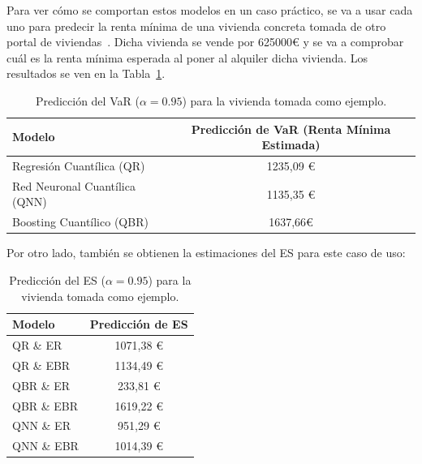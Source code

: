 \documentclass[11pt]{book}
\theoremstyle{plain} %
\theoremstyle{definition} %
\begin{document}
Para ver cómo se comportan estos modelos en un caso práctico, se va a usar
cada uno para predecir la renta mínima de una vivienda concreta tomada de 
otro portal de viviendas~\cite{FC25}. Dicha vivienda se vende por 625000€ y 
se va a comprobar cuál es la renta mínima esperada al poner al alquiler dicha 
vivienda.
Los resultados se ven en la  Tabla~\ref{tab:var_predictions}.
 \newpage
 \begin{table}[h!]
   \centering
   \begin{tabular}{|l|c|}
      \hline
      \textbf{Modelo} & \textbf{Predicción de VaR (Renta Mínima Estimada)} \\
      \hline
      Regresión Cuantílica (QR) &  1235,09 €\\
      Red Neuronal Cuantílica (QNN) & 1135,35 € \\
      Boosting Cuantílico (QBR) &  1637,66€\\
      \hline
   \end{tabular}
   \caption{Predicción del VaR ($\alpha=0.95$) para la vivienda tomada como ejemplo.}
   \label{tab:var_predictions}
\end{table}
Por otro lado, también se obtienen la estimaciones del ES para este caso de uso:
 \begin{table}[h!]
   \centering
   \begin{tabular}{|l|c|}
      \hline
      \textbf{Modelo} & \textbf{Predicción de ES} \\
      \hline
        QR \& ER &  1071,38 €\\
      QR \& EBR  &  1134,49 €\\
      QBR \& ER &  233,81 €\\
      QBR \& EBR &  1619,22 €\\
      QNN \& ER &  951,29 €\\
      QNN \& EBR &  1014,39 €\\
      \hline
   \end{tabular}
   \caption{Predicción del ES ($\alpha=0.95$) para la vivienda tomada como ejemplo.}
   \label{tab:es_predictions}
\end{table}
\end{document}
